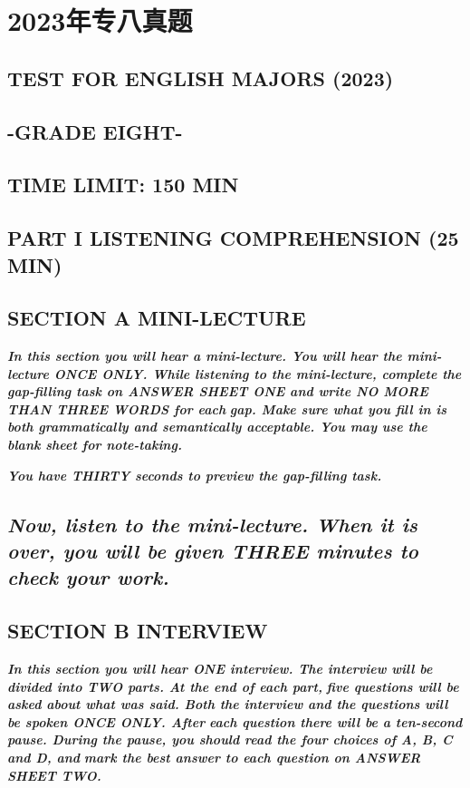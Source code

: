 \documentclass[UTF8,11pt]{ctexart}
\begin{document}
\section*{2023年专八真题}
\subsection*{\textbf{TEST} \textbf{FOR} \textbf{ENGLISH} \textbf{MAJORS (2023)}}


\subsection*{\textbf{-GRADE EIGHT-}}


\subsection*{\textbf{TIME LIMIT: 150 MIN}}


\subsection*{\textbf{PART I LISTENING COMPREHENSION (25 MIN})}


\subsection*{\textbf{SECTION A MINI-LECTURE}}


\textbf{\textit{In this section you will hear a mini-lecture. You will hear the mini-lecture ONCE ONLY. While listening to the mini-lecture, complete the gap-filling task on ANSWER SHEET ONE and write NO MORE THAN THREE WORDS for each}} \textbf{\textit{gap. Make sure what you fill in is both grammatically and semantically acceptable. You may use the blank sheet for note-taking.}}


\textbf{\textit{You have THIRTY seconds to preview the gap-filling task.}}


\subsection*{\textbf{\textit{Now, listen to the mini-lecture. When it is over, you will be given THREE minutes to check your work.}}}


\subsection*{\textbf{SECTION B INTERVIEW}}


\textbf{\textit{In this section you will hear ONE interview. The interview will be divided into TWO parts. At the end of each part,}} \textbf{\textit{five questions will be asked about what was said. Both the interview and the questions will be spoken ONCE ONLY. After}} \textbf{\textit{each question there will be a ten-second pause. During the pause, you should read the four choices of A, B, C and D, and}} \textbf{\textit{mark the best answer to each question on ANSWER SHEET TWO.}}
\end{document}
